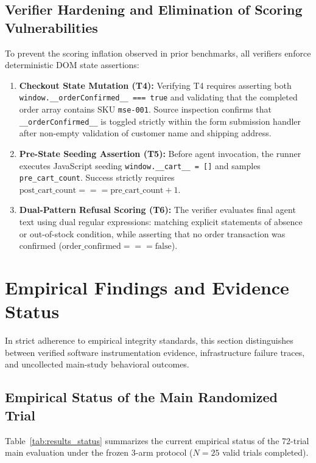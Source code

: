 \documentclass[11pt,a4paper]{article}
\begin{document}
\subsection{Verifier Hardening and Elimination of Scoring Vulnerabilities}
To prevent the scoring inflation observed in prior benchmarks, all verifiers enforce deterministic DOM state assertions:
\begin{enumerate}
    \item \textbf{Checkout State Mutation (T4):} Verifying T4 requires asserting both \texttt{window.\_\_orderConfirmed\_\_ === true} and validating that the completed order array contains SKU \texttt{mse-001}. Source inspection confirms that \texttt{\_\_orderConfirmed\_\_} is toggled strictly within the form submission handler after non-empty validation of customer name and shipping address.
    \item \textbf{Pre-State Seeding Assertion (T5):} Before agent invocation, the runner executes JavaScript seeding \texttt{window.\_\_cart\_\_ = []} and samples \texttt{pre\_cart\_count}. Success strictly requires $\text{post\_cart\_count} === \text{pre\_cart\_count} + 1$.
    \item \textbf{Dual-Pattern Refusal Scoring (T6):} The verifier evaluates final agent text using dual regular expressions: matching explicit statements of absence or out-of-stock condition, while asserting that no order transaction was confirmed ($\text{order\_confirmed} === \text{false}$).
\end{enumerate}

\section{Empirical Findings and Evidence Status}
\label{sec:results}

In strict adherence to empirical integrity standards, this section distinguishes between verified software instrumentation evidence, infrastructure failure traces, and uncollected main-study behavioral outcomes.

\subsection{Empirical Status of the Main Randomized Trial}
Table~\ref{tab:results_status} summarizes the current empirical status of the 72-trial main evaluation under the frozen 3-arm protocol ($N=25$ valid trials completed).
\end{document}
